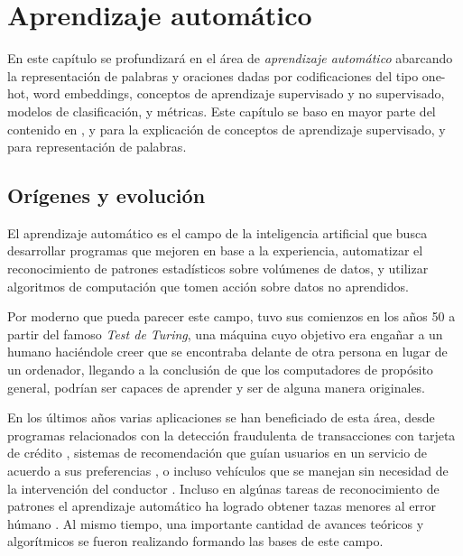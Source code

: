 \chapter{Aprendizaje automático}
\label{ch:lit_ml}

En este capítulo se profundizará en el área de \emph{aprendizaje automático}
abarcando la representación de palabras y oraciones dadas por codificaciones del
tipo one-hot, word embeddings, conceptos de aprendizaje supervisado y no
supervisado, modelos de clasificación, y métricas. Este capítulo se baso en
mayor parte del contenido en \citep{Bishop-2006}, y \citep{Tianqi-2016} para la
explicación de conceptos de aprendizaje supervisado, y
\citep{Bojanowski-Grave-Joulin-Mikolov-2016, bojanowski-2017, Mikolov-2013} para
representación de palabras.

\section{Orígenes y evolución}

El aprendizaje automático es el campo de la inteligencia artificial que busca
desarrollar programas que mejoren en base a la experiencia, automatizar el
reconocimiento de patrones estadísticos sobre volúmenes de datos, y utilizar
algoritmos de computación que tomen acción sobre datos no aprendidos.

Por moderno que pueda parecer este campo, tuvo sus comienzos en los años 50 a
partir del famoso \emph{Test de Turing}, una máquina cuyo objetivo era engañar a
un humano haciéndole creer que se encontraba delante de otra persona en lugar de
un ordenador, llegando  a la conclusión de que los computadores de propósito
general, podrían ser capaces de aprender y ser de alguna manera originales.
\citep{test-turing-website}

En los últimos años varias aplicaciones se han beneficiado de esta área, desde
programas relacionados con la detección fraudulenta de transacciones con tarjeta
de crédito \citep{Fang-2021}, sistemas de recomendación que guían usuarios en un
servicio de acuerdo a sus preferencias \citep{Burke-2007}, o incluso vehículos
que se manejan sin necesidad de la intervención del conductor
\citep{Sorin-2019}. Incluso en algúnas tareas de reconocimiento de patrones el
aprendizaje automático ha logrado obtener tazas menores al error húmano
\citep{niklas-et-al-2020}. Al mismo tiempo, una importante cantidad de avances
teóricos y algorítmicos se fueron realizando formando las bases de este campo. 

